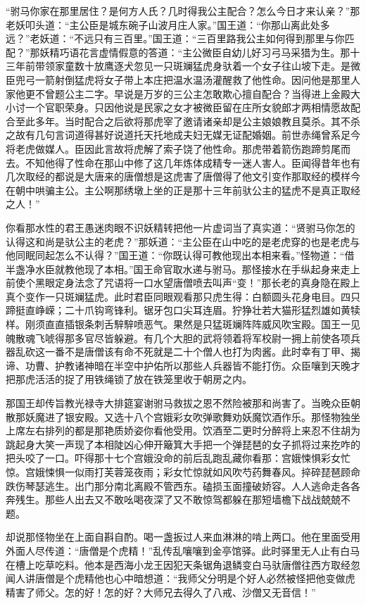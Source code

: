 \documentclass[12pt,UTF8]{ctexbook}
\begin{document}
“驸马你家在那里居住？是何方人氏？几时得我公主配合？怎么今日才来认亲？”那老妖叩头道：“主公臣是城东碗子山波月庄人家。”国王道：“你那山离此处多远？”老妖道：“不远只有三百里。”国王道：“三百里路我公主如何得到那里与你匹配？”那妖精巧语花言虚情假意的答道：“主公微臣自幼儿好习弓马采猎为生。那十三年前带领家童数十放鹰逐犬忽见一只斑斓猛虎身驮着一个女子往山坡下走。是微臣兜弓一箭射倒猛虎将女子带上本庄把温水温汤灌醒救了他性命。因问他是那里人家他更不曾题公主二字。早说是万岁的三公主怎敢欺心擅自配合？当得进上金殿大小讨一个官职荣身。只因他说是民家之女才被微臣留在庄所女貌郎才两相情愿故配合至此多年。当时配合之后欲将那虎宰了邀请诸亲却是公主娘娘教且莫杀。其不杀之故有几句言词道得甚好说道托天托地成夫妇无媒无证配婚姻。前世赤绳曾系足今将老虎做媒人。臣因此言故将虎解了索子饶了他性命。那虎带着箭伤跑蹄剪尾而去。不知他得了性命在那山中修了这几年炼体成精专一迷人害人。臣闻得昔年也有几次取经的都说是大唐来的唐僧想是这虎害了唐僧得了他文引变作那取经的模样今在朝中哄骗主公。主公啊那绣墩上坐的正是那十三年前驮公主的猛虎不是真正取经之人！”

你看那水性的君王愚迷肉眼不识妖精转把他一片虚词当了真实道：“贤驸马你怎的认得这和尚是驮公主的老虎？”那妖道：“主公臣在山中吃的是老虎穿的也是老虎与他同眠同起怎么不认得？”国王道：“你既认得可教他现出本相来看。”怪物道：“借半盏净水臣就教他现了本相。”国王命官取水递与驸马。那怪接水在手纵起身来走上前使个黑眼定身法念了咒语将一口水望唐僧喷去叫声“变！”那长老的真身隐在殿上真个变作一只斑斓猛虎。此时君臣同眼观看那只虎生得：白额圆头花身电目。四只蹄挺直峥嵘；二十爪钩弯锋利。锯牙包口尖耳连眉。狞狰壮若大猫形猛烈雄如黄犊样。刚须直直插银条刺舌騂騂喷恶气。果然是只猛斑斓阵阵威风吹宝殿。国王一见魄散魂飞唬得那多官尽皆躲避。有几个大胆的武将领着将军校尉一拥上前使各项兵器乱砍这一番不是唐僧该有命不死就是二十个僧人也打为肉酱。此时幸有丁甲、揭谛、功曹、护教诸神暗在半空中护佑所以那些人兵器皆不能打伤。众臣嚷到天晚才把那虎活活的捉了用铁绳锁了放在铁笼里收于朝房之内。

那国王却传旨教光禄寺大排筵宴谢驸马救拔之恩不然险被那和尚害了。当晚众臣朝散那妖魔进了银安殿。又选十八个宫娥彩女吹弹歌舞劝妖魔饮酒作乐。那怪物独坐上席左右排列的都是那艳质娇姿你看他受用。饮酒至二更时分醉将上来忍不住胡为跳起身大笑一声现了本相陡凶心伸开簸箕大手把一个弹琵琶的女子抓将过来扢咋的把头咬了一口。吓得那十七个宫娥没命的前后乱跑乱藏你看那：宫娥悚惧彩女忙惊。宫娥悚惧一似雨打芙蓉笼夜雨；彩女忙惊就如风吹芍药舞春风。捽碎琵琶顾命跌伤琴瑟逃生。出门那分南北离殿不管西东。磕损玉面撞破娇容。人人逃命走各各奔残生。那些人出去又不敢吆喝夜深了又不敢惊驾都躲在那短墙檐下战战兢兢不题。

却说那怪物坐在上面自斟自酌。喝一盏扳过人来血淋淋的啃上两口。他在里面受用外面人尽传道：“唐僧是个虎精！”乱传乱嚷嚷到金亭馆驿。此时驿里无人止有白马在槽上吃草吃料。他本是西海小龙王因犯天条锯角退鳞变白马驮唐僧往西方取经忽闻人讲唐僧是个虎精他也心中暗想道：“我师父分明是个好人必然被怪把他变做虎精害了师父。怎的好！怎的好？大师兄去得久了八戒、沙僧又无音信！”
\end{document}
